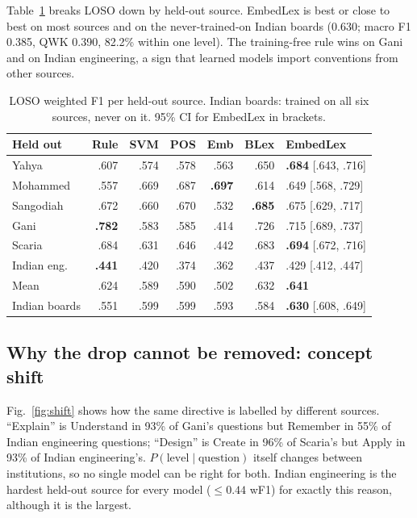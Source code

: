 \documentclass[conference]{IEEEtran}
\newcommand{\best}[1]{\textbf{#1}}
\begin{document}
Table~\ref{tab:loso} breaks LOSO down by held-out source. EmbedLex is best or close to best on
most sources and on the never-trained-on Indian boards (0.630; macro F1 0.385, QWK 0.390, 82.2\%
within one level). The training-free rule wins on Gani and on Indian engineering, a sign that
learned models import conventions from other sources.

\begin{table}[t]
\caption{LOSO weighted F1 per held-out source. Indian boards: trained on all six sources,
never on it. 95\% CI for EmbedLex in brackets.}
\label{tab:loso}
\centering\scriptsize
\setlength{\tabcolsep}{2.2pt}
\begin{tabular}{@{}lrrrrrl@{}}
\toprule
Held out & Rule & SVM & POS & Emb & BLex & EmbedLex \\
\midrule
Yahya & .607 & .574 & .578 & .563 & .650 & \best{.684} [.643, .716] \\
Mohammed & .557 & .669 & .687 & \best{.697} & .614 & .649 [.568, .729] \\
Sangodiah & .672 & .660 & .670 & .532 & \best{.685} & .675 [.629, .717] \\
Gani & \best{.782} & .583 & .585 & .414 & .726 & .715 [.689, .737] \\
Scaria & .684 & .631 & .646 & .442 & .683 & \best{.694} [.672, .716] \\
Indian eng. & \best{.441} & .420 & .374 & .362 & .437 & .429 [.412, .447] \\
\midrule
Mean & .624 & .589 & .590 & .502 & .632 & \best{.641} \\
Indian boards & .551 & .599 & .599 & .593 & .584 & \best{.630} [.608, .649] \\
\bottomrule
\end{tabular}
\end{table}

\subsection{Why the drop cannot be removed: concept shift}
Fig.~\ref{fig:shift} shows how the same directive is labelled by different sources. ``Explain''
is Understand in 93\% of Gani's questions but Remember in 55\% of Indian engineering questions;
``Design'' is Create in 96\% of Scaria's but Apply in 93\% of Indian engineering's.
$P(\text{level}\mid\text{question})$ itself changes between institutions, so no single model can
be right for both. Indian engineering is the hardest held-out source for every model
($\le 0.44$ wF1) for exactly this reason, although it is the largest.
\end{document}
